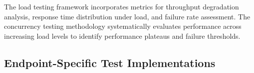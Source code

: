                     
        
        
        
        


The load testing framework incorporates metrics for throughput degradation analysis, response time distribution under load, and failure rate assessment. The concurrency testing methodology systematically evaluates performance across increasing load levels to identify performance plateaus and failure thresholds.

\subsection{Endpoint-Specific Test Implementations}

